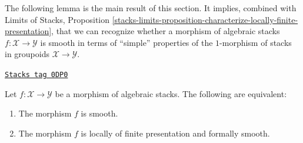 The following lemma is the main result of this section.
It implies, combined with
Limits of Stacks, Proposition
\ref{stacks-limits-proposition-characterize-locally-finite-presentation},
that we can recognize whether a morphism of algebraic stacks
$f : \mathcal{X} \to \mathcal{Y}$ is smooth in terms of
``simple'' properties of the $1$-morphism of stacks in groupoids
$\mathcal{X} \to \mathcal{Y}$.

\begin{lemma}

\label{stacks-more-morphisms-lemma-smooth-formally-smooth}
\href{https://stacks.math.columbia.edu/tag/0DP0}{\texttt{Stacks tag 0DP0}}

Let $f : \mathcal{X} \to \mathcal{Y}$ be a morphism of algebraic stacks.
The following are equivalent:
\begin{enumerate}
\item The morphism $f$ is smooth.
\item The morphism $f$ is locally of finite presentation and
formally smooth.
\end{enumerate}
\end{lemma}

